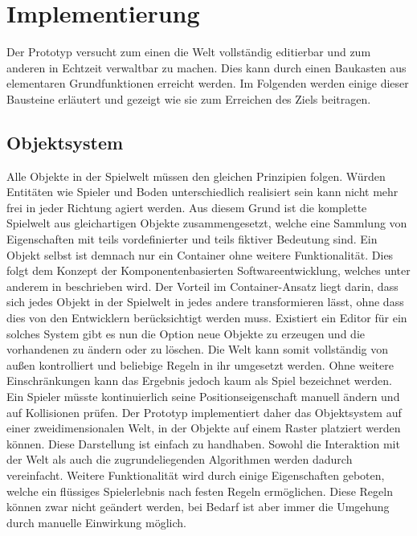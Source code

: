 \chapter{Implementierung}
\label{implementation}

Der Prototyp versucht zum einen die Welt vollständig editierbar und zum anderen in Echtzeit verwaltbar zu machen. Dies kann durch einen Baukasten aus elementaren Grundfunktionen erreicht werden. Im Folgenden werden einige dieser Bausteine erläutert und gezeigt wie sie zum Erreichen des Ziels beitragen.

\section{Objektsystem}
\label{sec:Objektsystem}
Alle Objekte in der Spielwelt müssen den gleichen Prinzipien folgen. Würden Entitäten wie Spieler und Boden unterschiedlich realisiert sein kann nicht mehr frei in jeder Richtung agiert werden. Aus diesem Grund ist die komplette Spielwelt aus gleichartigen Objekte zusammengesetzt, welche eine Sammlung von Eigenschaften mit teils vordefinierter und teils fiktiver Bedeutung sind. Ein Objekt selbst ist demnach nur ein Container ohne weitere Funktionalität. Dies folgt dem Konzept der Komponentenbasierten Softwareentwicklung, welches unter anderem in \cite{CBSE} beschrieben wird.\newline
Der Vorteil im Container-Ansatz liegt darin, dass sich jedes Objekt in der Spielwelt in jedes andere transformieren lässt, ohne dass dies von den Entwicklern berücksichtigt werden muss.\newline
Existiert ein Editor für ein solches System gibt es nun die Option neue Objekte zu erzeugen und die vorhandenen zu ändern oder zu löschen. Die Welt kann somit vollständig von außen kontrolliert und beliebige Regeln in ihr umgesetzt werden. Ohne weitere Einschränkungen kann das Ergebnis jedoch kaum als Spiel bezeichnet werden. Ein Spieler müsste kontinuierlich seine Positionseigenschaft manuell ändern und auf Kollisionen prüfen.\newline
Der Prototyp implementiert daher das Objektsystem auf einer zweidimensionalen Welt, in der Objekte auf einem Raster platziert werden können. Diese Darstellung ist einfach zu handhaben. Sowohl die Interaktion mit der Welt als auch die zugrundeliegenden Algorithmen werden dadurch vereinfacht. Weitere Funktionalität wird durch einige Eigenschaften geboten, welche ein flüssiges Spielerlebnis nach festen Regeln ermöglichen. Diese Regeln können zwar nicht geändert werden, bei Bedarf ist aber immer die Umgehung durch manuelle Einwirkung möglich.\newline


